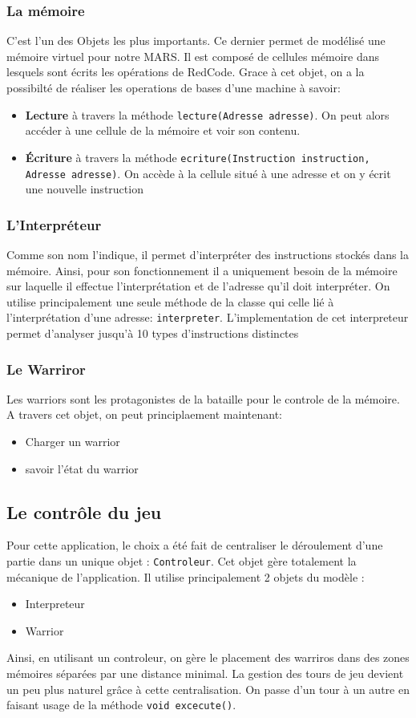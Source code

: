 \documentclass[12pt]{article}
\newcommand{\classname}[1]{\texttt{#1}}
\newcommand{\methodname}[1]{\texttt{#1}}
\begin{document}
\subsubsection*{La mémoire}
C'est l'un des Objets les plus importants. Ce dernier permet de modélisé une mémoire virtuel pour notre MARS. Il est composé de cellules mémoire dans lesquels sont écrits les opérations de RedCode. Grace à cet objet, on a la possibilté de réaliser les operations de bases d'une machine à savoir:
\begin{itemize}
	\item \textbf{Lecture} à travers la méthode \methodname{lecture(Adresse adresse)}. On peut alors accéder à une cellule de la mémoire et voir son contenu.
	\item \textbf{Écriture} à travers la méthode \methodname{ecriture(Instruction instruction, Adresse adresse)}. On accède à la cellule situé à une adresse et on y écrit une nouvelle instruction
\end{itemize}

\subsubsection*{L’Interpréteur}
Comme son nom l'indique, il permet d'interpréter des instructions stockés dans la mémoire. Ainsi, pour son fonctionnement il a uniquement besoin de la mémoire sur laquelle il effectue l’interprétation et de l’adresse qu'il doit interpréter. On utilise principalement une seule méthode de la classe qui celle lié à l’interprétation d'une adresse: \methodname{interpreter}.
L'implementation de cet interpreteur permet d'analyser jusqu'à 10 types d'instructions distinctes
\subsubsection*{Le Warriror}
Les warriors sont les protagonistes de la bataille pour le controle de la mémoire. A travers cet objet, on peut principlaement maintenant:
\begin{itemize}
	\item Charger un warrior
	\item savoir l'état du warrior
\end{itemize}
\subsection{Le contrôle du jeu}
Pour cette application, le choix a été fait de centraliser le déroulement d'une partie dans un unique objet : \classname{Controleur}.
Cet objet gère totalement la mécanique de l'application. Il utilise principalement 2 objets du modèle :
\begin{itemize}
	\item Interpreteur
	\item Warrior
\end{itemize}
Ainsi, en utilisant un controleur, on gère le placement des warriros dans des zones mémoires séparées par une distance minimal.
La gestion des tours de jeu devient un peu plus naturel grâce à cette centralisation. On passe d'un tour à un autre en faisant
usage de la méthode \methodname{void excecute()}.
\end{document}

